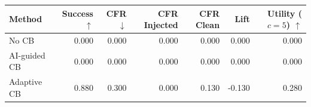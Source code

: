 \begin{tabular}{lrrrrrr}
\toprule
Method & Success $\uparrow$ & CFR $\downarrow$ & CFR Injected & CFR Clean & Lift & Utility ($c=5$) $\uparrow$ \\
\midrule
No CB & 0.000 & 0.000 & 0.000 & 0.000 & 0.000 & 0.000 \\
AI-guided CB & 0.000 & 0.000 & 0.000 & 0.000 & 0.000 & 0.000 \\
Adaptive CB & 0.880 & 0.300 & 0.000 & 0.130 & -0.130 & 0.280 \\
\bottomrule
\end{tabular}
